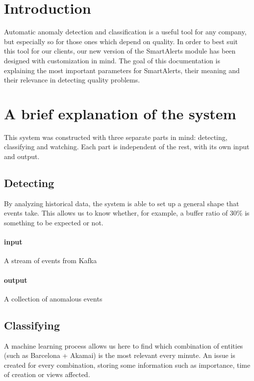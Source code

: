 \documentclass[12pt,titlepage]{article}
\begin{document}




\thispagestyle{frontpage}
\maketitle


\section*{Introduction}

Automatic anomaly detection and classification is a useful tool for any company, but especially so for those ones which depend on quality. In order to best suit this tool for our clients, our new version of the SmartAlerts module has been designed with customization in mind. The goal of this documentation is explaining the most important parameters for SmartAlerts, their meaning and their relevance in detecting quality problems.

\tableofcontents
\newpage

\section{A brief explanation of the system}

This system was constructed with three separate parts in mind: detecting, classifying and watching. Each part is independent of the rest, with its own input and output.

\subsection{Detecting}
By analyzing historical data, the system is able to set up a general shape that events take. This allows us to know whether, for example, a buffer ratio of 30\% is something to be expected or not.
\paragraph{input} A stream of events from Kafka
\paragraph{output} A collection of anomalous events

\subsection{Classifying}
A machine learning process allows us here to find which combination of entities (such as Barcelona + Akamai) is the most relevant every minute. An issue is created for every combination, storing some information such as importance, time of creation or views affected.
\end{document}
